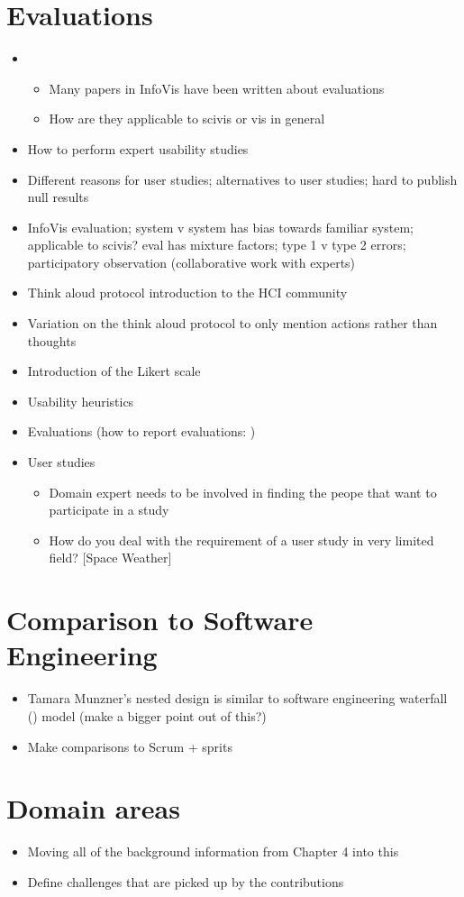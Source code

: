\section{Evaluations}
\begin{itemize}
\item \begin{itemize}
    \item Many papers in InfoVis have been written about evaluations
    \item How are they applicable to scivis or vis in general
\end{itemize}
\item \cite{tory2005evaluating} How to perform expert usability studies
\item \cite{kosara2003thoughts} Different reasons for user studies; alternatives to user studies; hard to publish null results
\item \cite{carpendale2008evaluating} InfoVis evaluation; system v system has bias towards familiar system; applicable to scivis? eval has mixture factors; type 1 v type 2 errors; participatory observation (collaborative work with experts)
\item \cite{lewis1993task} Think aloud protocol introduction to the HCI community
\item \cite{ericsson1980verbal} Variation on the think aloud protocol to only mention actions rather than thoughts
\item \cite{likert1932technique} Introduction of the Likert scale
\item \cite{nielsen1994heuristic} Usability heuristics
\item Evaluations \cite{plaisant2004challenge} (how to report evaluations: \cite{forsell2012guide})
\item User studies
\begin{itemize}
  \item Domain expert needs to be involved in finding the peope that want to participate in a study
  \item How do you deal with the requirement of a user study in very limited field? [Space Weather]
\end{itemize}

\end{itemize}

\section{Comparison to Software Engineering}
\begin{itemize}
\item Tamara Munzner's nested design is similar to software engineering waterfall (\cite{royce1987managing, victor2003iterative}) model (make a bigger point out of this?)
\item Make comparisons to Scrum + sprits
\end{itemize}

\section{Domain areas}
\label{app:domain}

\begin{itemize}
\item Moving all of the background information from Chapter 4 into this
\item Define challenges that are picked up by the contributions
\end{itemize}
